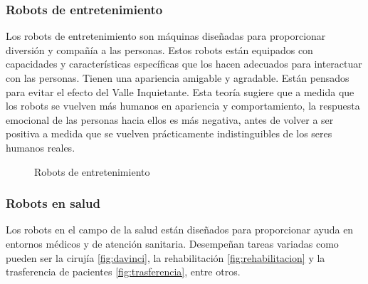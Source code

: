 \subsubsection{Robots de entretenimiento}
Los robots de entretenimiento son máquinas diseñadas para proporcionar diversión y compañía a las personas. Estos robots están equipados con capacidades y 
características específicas que los hacen adecuados para interactuar con las personas. Tienen una apariencia amigable y agradable. Están pensados para 
evitar el efecto del Valle Inquietante. Esta teoría sugiere que a medida que los robots se vuelven más humanos en apariencia y comportamiento, la respuesta 
emocional de las personas hacia ellos es más negativa, antes de volver a ser positiva a medida que se vuelven prácticamente 
indistinguibles de los seres humanos reales.
\begin{figure} [ht!]
  \centering    
  \hspace{1cm}
  \caption{Robots de entretenimiento}
\end{figure}

\subsubsection{Robots en salud}
Los robots en el campo de la salud están diseñados para proporcionar ayuda en entornos médicos y de atención sanitaria. Desempeñan tareas 
variadas como pueden ser la cirujía \ref{fig:davinci}, la rehabilitación \ref{fig:rehabilitacion} y la trasferencia de pacientes \ref{fig:trasferencia}, entre otros.

